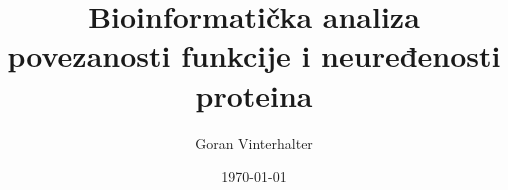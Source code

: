 \documentclass{beamer}
\title{Bioinformatička analiza povezanosti funkcije i neuređenosti proteina}
\author{Goran Vinterhalter}
\institute{ Matematički fakultet, Beogradski univerzitet }
\date{\today}
\begin{document}
\begin{frame}
  \titlepage
\end{frame}



%
\end{document}
